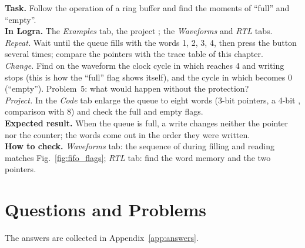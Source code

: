 \begin{diybox}
\textbf{Task.} Follow the operation of a ring buffer and find the moments of
``full'' and ``empty''.\\
\textbf{In Logra.} The \emph{Examples} tab, the project ;
the \emph{Waveforms} and \emph{RTL} tabs.\\
 \emph{Repeat.} Wait until the queue fills with the words
1, 2, 3, 4, then press the button several times; compare the pointers with the
trace table of this chapter.\\
 \emph{Change.} Find on the waveform the clock cycle in which 
reaches 4 and writing stops (this is how the ``full'' flag shows itself), and the cycle
in which  becomes 0 (``empty''). Problem~5: what would happen without
the protection?\\
 \emph{Project.} In the \emph{Code} tab enlarge the queue to eight
words (3-bit pointers, a 4-bit , comparison with 8) and
check the full and empty flags.\\
\textbf{Expected result.} When the queue is full, a write changes neither the
pointer nor the counter; the words come out in the order they were written.\\
\textbf{How to check.} \emph{Waveforms} tab: the sequence of
 during filling and reading matches Fig.~\ref{fig:fifo_flags};
\emph{RTL} tab: find the word memory and the two pointers.
\end{diybox}

\section{Questions and Problems}
\label{sec:tasks-fsmdesign}

The answers are collected in Appendix~\ref{app:answers}.

